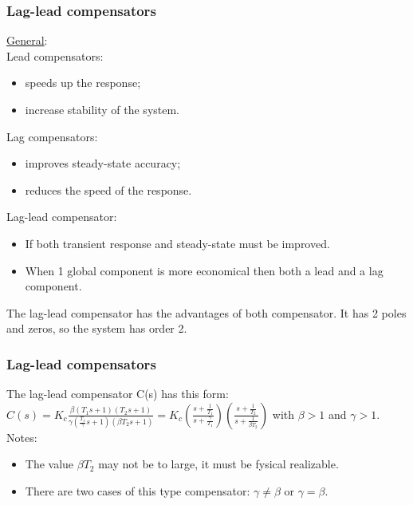 \begin{frame}
	\frametitle{Lag-lead compensators}
		\underline{General}:\\
		Lead compensators: 
		\begin{itemize}
			\item speeds up the response;
			\item increase stability of the system.
		\end{itemize}
		Lag compensators:
		\begin{itemize}
			\item improves steady-state accuracy;
			\item reduces the speed of the response.
		\end{itemize}
		Lag-lead compensator:
		\begin{itemize}
			\item If both transient response and steady-state must be improved.
			\item When 1 global component is more economical then both a lead and a lag component.
		\end{itemize}
		The lag-lead compensator has the advantages of both compensator. It has 2 poles and zeros, so the system has order 2.
\end{frame}

\begin{frame}
	\frametitle{Lag-lead compensators}
	The lag-lead compensator C(s) has this form: \\
	$C(s)=K_c\frac{\beta (T_1s+1)(T_2s+1)}{\gamma (\frac{T_1}{\gamma}s+1)(\beta T_2s+1)}=K_c(\frac{s+\frac{1}{T_1}}{s+\frac{\gamma}{T_1}})
	(\frac{s+\frac{1}{T_2}}{s+\frac{1}{\beta T_2}})$ with $\beta>1$ and $\gamma>1$.\vspace{4mm}
	Notes:
	\begin{itemize}
		\item The value $\beta T_2$ may not be to large, it must be fysical realizable.
		\item  There are two cases of this type compensator: $\gamma\neq \beta$ or $\gamma= \beta$.
	\end{itemize}
\end{frame}

